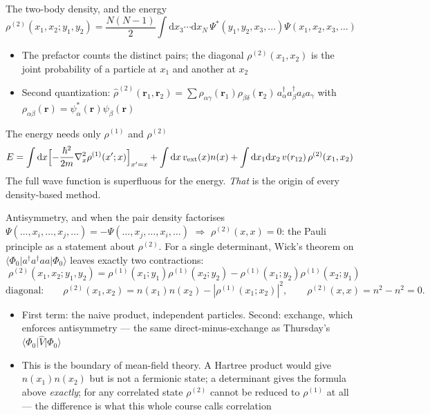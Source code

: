 \documentclass[aspectratio=169,10pt]{beamer}
\newcommand{\element}[3]{\langle #1\vert #2\vert #3\rangle}
\newcommand{\ad}[1]{a_{#1}^{\dagger}}
\newcommand{\dd}{\mathrm{d}}
\begin{document}
\begin{frame}{The two-body density, and the energy}
  \[
    \rho^{(2)}(x_1,x_2;y_1,y_2)=\frac{N(N-1)}{2}\int\dd x_3\cdots\dd x_N\,\Psi^{*}(y_1,y_2,x_3,\dots)\Psi(x_1,x_2,x_3,\dots)
  \]
  \begin{itemize}
    \item The prefactor counts the distinct pairs; the diagonal $\rho^{(2)}(x_1,x_2)$ is the joint probability of a particle at $x_1$ and another at $x_2$
    \item Second quantization: $\hat\rho^{(2)}(\bm r_1,\bm r_2)=\sum\rho_{\alpha\gamma}(\bm r_1)\rho_{\beta\delta}(\bm r_2)\,\ad\alpha\ad\beta a_\delta a_\gamma$ with $\rho_{\alpha\beta}(\bm r)=\psi_\alpha^{*}(\bm r)\psi_\beta(\bm r)$
  \end{itemize}
  \begin{block}{The energy needs only $\rho^{(1)}$ and $\rho^{(2)}$}
    \[
      E=\int\dd x\Bigl[-\frac{\hbar^2}{2m}\nabla^2_{x}\rho^{(1)}(x';x)\Bigr]_{x'=x}+\int\dd x\,v_{\rm ext}(x)n(x)+\int\dd x_1\dd x_2\,v(r_{12})\,\rho^{(2)}(x_1,x_2)
    \]
    The full wave function is superfluous for the energy. \emph{That} is the origin of every density-based method.
  \end{block}
\end{frame}

\begin{frame}{Antisymmetry, and when the pair density factorises}
  $\Psi(\dots,x_i,\dots,x_j,\dots)=-\Psi(\dots,x_j,\dots,x_i,\dots)$ $\Rightarrow$ $\rho^{(2)}(x,x)=0$: the Pauli principle as a statement about $\rho^{(2)}$.
  \vspace{0.3em}
  For a single determinant, Wick's theorem on $\element{\Phi_0}{\ad{}\ad{}aa}{\Phi_0}$ leaves exactly two contractions:
  \[
    \boxed{\;\rho^{(2)}(x_1,x_2;y_1,y_2)=\rho^{(1)}(x_1;y_1)\rho^{(1)}(x_2;y_2)-\rho^{(1)}(x_1;y_2)\rho^{(1)}(x_2;y_1)\;}
  \]
  \[
    \text{diagonal:}\qquad\rho^{(2)}(x_1,x_2)=n(x_1)n(x_2)-|\rho^{(1)}(x_1;x_2)|^2,\qquad\rho^{(2)}(x,x)=n^2-n^2=0.
  \]
  \begin{itemize}
    \item First term: the naive product, independent particles. Second: exchange, which enforces antisymmetry --- the same direct-minus-exchange as Thursday's $\element{\Phi_0}{\hat V}{\Phi_0}$
    \item \alert{This is the boundary of mean-field theory.} A Hartree product would give $n(x_1)n(x_2)$ but is not a fermionic state; a determinant gives the formula above \emph{exactly}; for any correlated state $\rho^{(2)}$ cannot be reduced to $\rho^{(1)}$ at all --- the difference is what this whole course calls correlation
  \end{itemize}
\end{frame}
\end{document}
